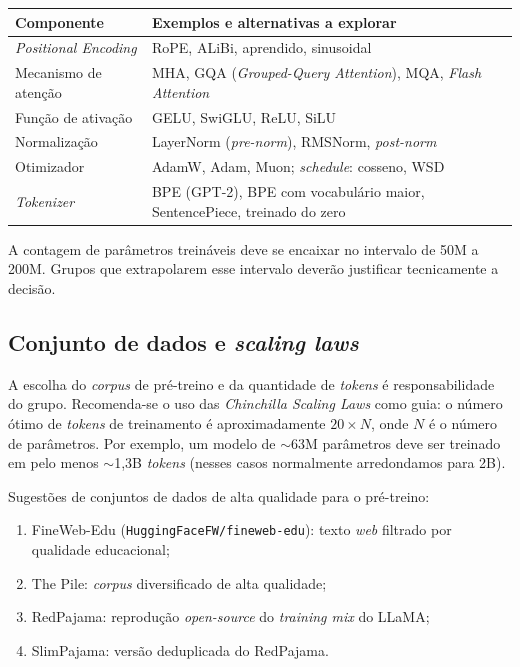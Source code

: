 \documentclass{dlproblemset}
\begin{document}
\begin{table}[H]
    \centering
    \begin{tabular}{@{}lp{}@{}}
        \toprule
        \textbf{Componente} & \textbf{Exemplos e alternativas a explorar} \\
        \midrule
        \textit{Positional Encoding} & RoPE, ALiBi, aprendido, sinusoidal \\
        Mecanismo de atenção & MHA, GQA (\textit{Grouped-Query Attention}), MQA, \textit{Flash Attention} \\
        Função de ativação & GELU, SwiGLU, ReLU, SiLU \\
        Normalização & LayerNorm (\textit{pre-norm}), RMSNorm, \textit{post-norm} \\
        Otimizador & AdamW, Adam, Muon; \textit{schedule}: cosseno, WSD \\
        \textit{Tokenizer} & BPE (GPT-2), BPE com vocabulário maior, SentencePiece, treinado do zero \\
        \bottomrule
    \end{tabular}
\end{table}

A contagem de parâmetros treináveis deve se encaixar no intervalo de 50M a 200M. Grupos que extrapolarem esse intervalo deverão justificar tecnicamente a decisão.

\subsection*{Conjunto de dados e \textit{scaling laws}}

A escolha do \textit{corpus} de pré-treino e da quantidade de \textit{tokens} é responsabilidade do grupo. Recomenda-se o uso das \textit{Chinchilla Scaling Laws} como guia: o número ótimo de \textit{tokens} de treinamento é aproximadamente $20 \times N$, onde $N$ é o número de parâmetros. Por exemplo, um modelo de $\sim$63M parâmetros deve ser treinado em pelo menos $\sim$1,3B \textit{tokens} (nesses casos normalmente arredondamos para 2B).

Sugestões de conjuntos de dados de alta qualidade para o pré-treino:

\begin{enumerate}[1)]
    \item FineWeb-Edu (\texttt{HuggingFaceFW/fineweb-edu}): texto \textit{web} filtrado por qualidade educacional;
    \item The Pile: \textit{corpus} diversificado de alta qualidade;
    \item RedPajama: reprodução \textit{open-source} do \textit{training mix} do LLaMA;
    \item SlimPajama: versão deduplicada do RedPajama.
\end{enumerate}
\end{document}
